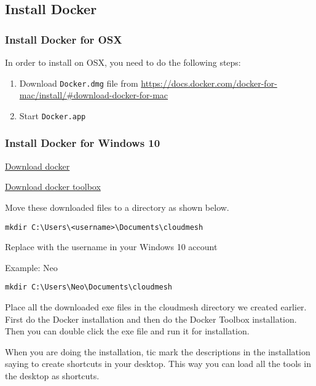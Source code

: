\subsection{Install Docker}

\subsubsection{Install Docker for OSX}

In order to install on OSX, you need to do the following steps:

\begin{enumerate}
\def\labelenumi{\arabic{enumi}.}
\item
  Download \texttt{Docker.dmg} file from
  \href{}{https://docs.docker.com/docker-for-mac/install/\#download-docker-for-mac}
\item
  Start \texttt{Docker.app}
\end{enumerate}

\subsubsection{Install Docker for Windows
10}\label{install-docker-for-windows-10}

\href{https://download.docker.com/win/stable/Docker\%20for\%20Windows\%20Installer.exe}{Download
docker}

\href{https://download.docker.com/win/stable/DockerToolbox.exe}{Download
docker toolbox}

Move these downloaded files to a directory as shown below.

\begin{verbatim}
mkdir C:\Users\<username>\Documents\cloudmesh
\end{verbatim}

Replace with the username in your Windows 10 account

Example: Neo

\begin{verbatim}
mkdir C:\Users\Neo\Documents\cloudmesh
\end{verbatim}

Place all the downloaded exe files in the cloudmesh directory we created
earlier. First do the Docker installation and then do the Docker Toolbox
installation. Then you can double click the exe file and run it for
installation.

When you are doing the installation, tic mark the descriptions in the
installation saying to create shortcuts in your desktop. This way you
can load all the tools in the desktop as shortcuts.

